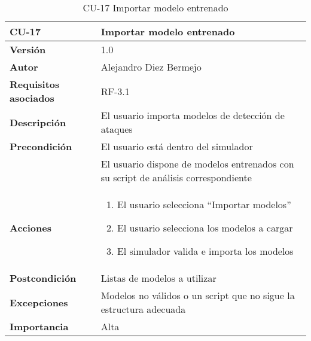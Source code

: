\begin{table}[p]
	\centering
	\begin{tabularx}{\linewidth}{ p{} p{} }
		\toprule
		\textbf{CU-17}    & \textbf{Importar modelo entrenado}\\
		\toprule
		\textbf{Versión}              & 1.0    \\
		\textbf{Autor}                & Alejandro Diez Bermejo \\
		\textbf{Requisitos asociados} & RF-3.1 \\
		\textbf{Descripción}          & El usuario importa modelos de detección de ataques \\
        \textbf{Precondición}         & El usuario está dentro del simulador \\
                                      & El usuario dispone de modelos entrenados con su script de análisis correspondiente \\
		\textbf{Acciones}             &
		\begin{enumerate}
			\def\labelenumi{\arabic{enumi}.}
			\tightlist
			\item El usuario selecciona ``Importar modelos''
            \item El usuario selecciona los modelos a cargar
            \item El simulador valida e importa los modelos
		\end{enumerate}\\
		\textbf{Postcondición}        & Listas de modelos a utilizar \\
		\textbf{Excepciones}          & Modelos no válidos o un script que no sigue la estructura adecuada \\
		\textbf{Importancia}          & Alta \\
		\bottomrule
	\end{tabularx}
	\caption{CU-17 Importar modelo entrenado}
\end{table}

